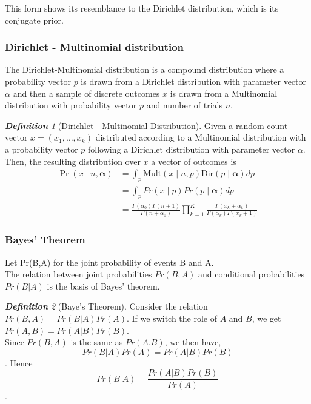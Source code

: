 \documentclass[12pt,oneside,a4paper]{book}
\theoremstyle{definition}
\theoremstyle{remark}
\newtheorem{defn}{\bf Definition}[subsection]
\begin{document}
					This form shows its resemblance to the Dirichlet distribution, which is its conjugate prior.
				\subsubsection{Dirichlet - Multinomial distribution}
					The Dirichlet-Multinomial distribution is a compound distribution where a probability vector $p$ is drawn from a Dirichlet distribution with parameter vector $\alpha$ and then a sample of discrete outcomes $x$ is drawn from a Multinomial distribution with probability vector $p$ and number of trials $n$.\cite{Minka2012EstimatingAD}
					\begin{defn}[Dirichlet - Multinomial Distribution]
						Given a random count vector $x=(x_1, \ldots, x_k)$ distributed according to a Multinomial distribution with a probability vector $p$ following a Dirichlet distribution with parameter vector $\alpha$. Then, the resulting distribution over $x$ a vector of outcomes is \cite{Minka2012EstimatingAD}
						\begin{equation}
						 \begin{aligned}
						 	\Pr({x} \mid n,{\boldsymbol {\alpha }}) &=
								 	\int _{p }
									 	\mathrm {Mult} (x \mid n,p )
									 	\mathrm {Dir} (p \mid {\boldsymbol {\alpha }})dp\\
									 								&=
									 \int _{p }
									 	Pr(x \mid p)Pr(p \mid \boldsymbol{\alpha}) dp\\
									 								&=
									 {\frac {\Gamma \left(\alpha _{0}\right)\Gamma \left(n+1\right)}{\Gamma \left(n+\alpha _{0}\right)}}\prod _{k=1}^{K}{\frac {\Gamma (x_{k}+\alpha _{k})}{\Gamma (\alpha _{k})\Gamma \left(x_{k}+1\right)}}
						 \end{aligned}
						\end{equation}
					\end{defn}

				\subsubsection{Bayes' Theorem}
				Let Pr(B,A) for the joint probability of events B and A.\\
				The relation between joint probabilities $Pr(B,A)$ and conditional probabilities $Pr(B|A)$ is the basis of Bayes’ theorem.\\
				\begin{defn}[Baye's Theorem]\label{dfn:bayestheorem}
					Consider the relation $ Pr(B,A) = Pr(B|A)Pr(A)$. If we switch the role of $A$ and $B$, we get $Pr(A,B) = Pr(A|B)Pr(B)$.\\
					Since $Pr(B,A)$ is the same as $Pr(A.B)$, we then have,
					\[
						Pr(B|A)Pr(A) = Pr(A|B)Pr(B)
					\].
					Hence
					\begin{equation}\label{eqn:baye_1}
						Pr(B|A) = \frac{Pr(A|B)Pr(B)}{Pr(A)}
					\end{equation}.\\
				\end{defn}
\end{document}
